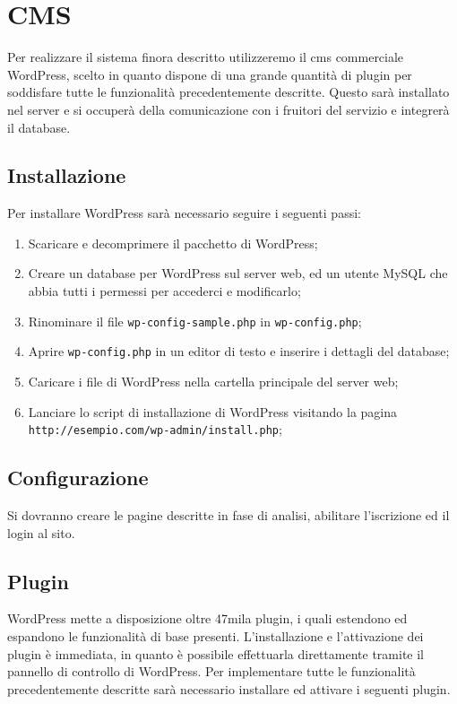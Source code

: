 \section{CMS}
Per realizzare il sistema finora descritto utilizzeremo il \gls{cms} commerciale WordPress, scelto in quanto dispone di una grande quantità di plugin per soddisfare tutte le funzionalità precedentemente descritte. Questo sarà installato nel server e si occuperà della comunicazione con i fruitori del servizio e integrerà il database.

\subsection{Installazione}
Per installare WordPress sarà necessario seguire i seguenti passi:
\begin{enumerate}
	\item Scaricare e decomprimere il pacchetto di WordPress;
	\item Creare un database per WordPress sul server web, ed un utente MySQL che abbia tutti i permessi per accederci e modificarlo;
	\item Rinominare il file \texttt{wp-config-sample.php} in \texttt{wp-config.php};
	\item Aprire \texttt{wp-config.php} in un editor di testo e inserire i dettagli del database;
	\item Caricare i file di WordPress nella cartella principale del server web;
	\item Lanciare lo script di installazione di WordPress visitando la pagina \texttt{http://esempio.com/wp-admin/install.php};
\end{enumerate}

\subsection{Configurazione}
Si dovranno creare le pagine descritte in fase di analisi, abilitare l'iscrizione ed il login al sito.

\subsection{Plugin} \label{sec_plugin}
WordPress mette a disposizione oltre 47mila plugin, i quali estendono ed espandono le funzionalità di base presenti.
L'installazione e l'attivazione dei plugin è immediata, in quanto è possibile effettuarla direttamente tramite il pannello di controllo di WordPress.
Per implementare tutte le funzionalità precedentemente descritte sarà necessario installare ed attivare i seguenti plugin.

